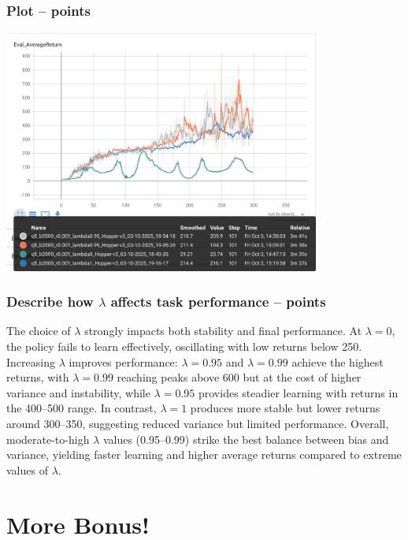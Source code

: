 \documentclass{article}
\begin{document}
\subsubsection{Plot --  points\rbrack}
\begin{answer}[title=Q8.1.2,height=10cm,width=\linewidth]
\centering
\includegraphics[height=8cm]{q5.png}
\end{answer}

\subsubsection{Describe how $\lambda$ affects task performance --  points\rbrack}
\begin{answer}[title=Q8.1.3,height=4cm,width=\linewidth]
The choice of $\lambda$ strongly impacts both stability and final performance. At $\lambda=0$, the policy fails to learn effectively, oscillating with low returns below 250. Increasing $\lambda$ improves performance: $\lambda=0.95$ and $\lambda=0.99$ achieve the highest returns, with $\lambda=0.99$ reaching peaks above 600 but at the cost of higher variance and instability, while $\lambda=0.95$ provides steadier learning with returns in the 400–500 range. In contrast, $\lambda=1$ produces more stable but lower returns around 300–350, suggesting reduced variance but limited performance. Overall, moderate-to-high $\lambda$ values (0.95–0.99) strike the best balance between bias and variance, yielding faster learning and higher average returns compared to extreme values of $\lambda$.
\end{answer}

\clearpage

\section{More Bonus!}
\end{document}
